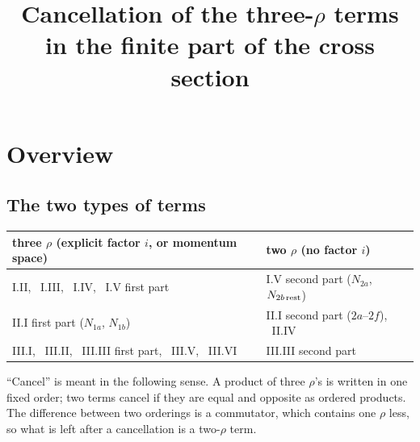 \documentclass[10pt]{article}
\title{Cancellation of the three-$\rho$ terms in the finite part of the cross section}
\author{}
\date{}
\numberwithin{equation}{section}
\begin{document}
\maketitle
\tableofcontents

\section{Overview}

\subsection{The two types of terms}
\begin{center}
\renewcommand{\arraystretch}{1.25}
\begin{tabular}{l|l}
three $\rho$ (explicit factor $i$, or momentum space) & two $\rho$ (no factor $i$)\\ \hline
I.II, \ I.III, \ I.IV, \ I.V first part & I.V second part ($N_{2a}$, $N_{2b\,\rm rest}$)\\
II.I first part ($N_{1a}$, $N_{1b}$) & II.I second part ($2a$--$2f$), \ II.IV\\
III.I, \ III.II, \ III.III first part, \ III.V, \ III.VI & III.III second part
\end{tabular}
\end{center}
``Cancel'' is meant in the following sense. A product of three $\rho$'s is written in one fixed order; two terms cancel if they are equal and opposite as ordered products. The difference between two orderings is a commutator, which contains one $\rho$ less, so what is left after a cancellation is a two-$\rho$ term.
\end{document}
